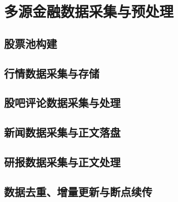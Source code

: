 
\chapter{多源金融数据采集与预处理}

\section{股票池构建}

\section{行情数据采集与存储}

\section{股吧评论数据采集与处理}

\section{新闻数据采集与正文落盘}

\section{研报数据采集与正文处理}

\section{数据去重、增量更新与断点续传}
